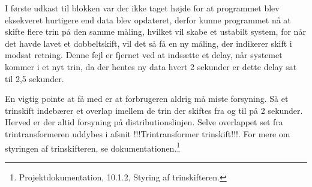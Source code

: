 I første udkast til blokken var der ikke taget højde for at programmet blev eksekveret hurtigere end data blev opdateret, derfor kunne programmet nå at skifte flere trin på den samme måling, hvilket vil skabe et ustabilt system, for når det havde lavet et dobbeltskift, vil det så få en ny måling, der indikerer skift i modsat retning. Denne fejl er fjernet ved at indsætte et delay, når systemet kommer i et nyt trin, da der hentes ny data hvert 2 sekunder er dette delay sat til 2,5 sekunder.


En vigtig pointe at få med er at forbrugeren aldrig må miste forsyning. Så et trinskift indebærer et overlap imellem de trin der skiftes fra og til på 2 sekunder. Herved er der altid forsyning på distributionslinjen. Selve overlappet set fra trintransformeren uddybes i afsnit !!!Trintransformer trinskift!!!.
For mere om styringen af trinskifteren, se dokumentationen.\footnote{Projektdokumentation, 10.1.2, Styring af trinskifteren.}
